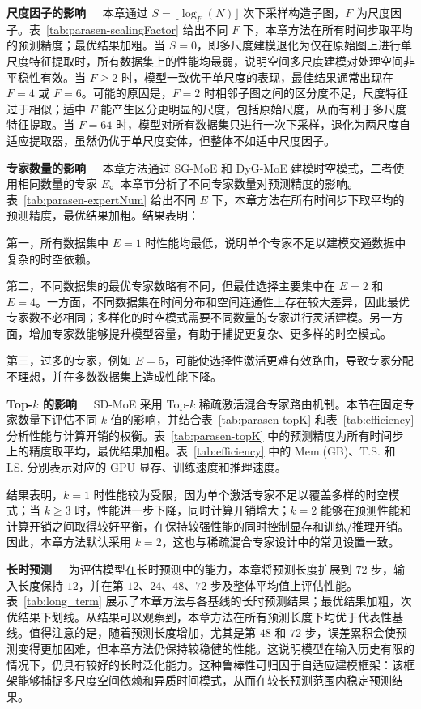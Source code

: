 \noindent\textbf{尺度因子的影响\ \ } 本章通过 $S=\lfloor \log_F(N)\rfloor$ 次下采样构造子图，$F$ 为尺度因子。表~\ref{tab:parasen-scalingFactor} 给出不同 $F$ 下，本章方法在所有时间步取平均的预测精度；最优结果加粗。当 $S=0$，即多尺度建模退化为仅在原始图上进行单尺度特征提取时，所有数据集上的性能均最弱，说明空间多尺度建模对处理空间非平稳性有效。当 $F\ge 2$ 时，模型一致优于单尺度的表现，最佳结果通常出现在 $F=4$ 或 $F=6$。可能的原因是，$F=2$ 时相邻子图之间的区分度不足，尺度特征过于相似；适中 $F$ 能产生区分更明显的尺度，包括原始尺度，从而有利于多尺度特征提取。当 $F=64$ 时，模型对所有数据集只进行一次下采样，退化为两尺度自适应提取器，虽然仍优于单尺度变体，但整体不如适中尺度因子。

\noindent\textbf{专家数量的影响\ \ } 本章方法通过 SG-MoE 和 DyG-MoE 建模时空模式，二者使用相同数量的专家 $E$。本章节分析了不同专家数量对预测精度的影响。表~\ref{tab:parasen-expertNum} 给出不同 $E$ 下，本章方法在所有时间步下取平均的预测精度，最优结果加粗。结果表明：

第一，所有数据集中 $E=1$ 时性能均最低，说明单个专家不足以建模交通数据中复杂的时空依赖。

第二，不同数据集的最优专家数略有不同，但最佳选择主要集中在 $E=2$ 和 $E=4$。一方面，不同数据集在时间分布和空间连通性上存在较大差异，因此最优专家数不必相同；多样化的时空模式需要不同数量的专家进行灵活建模。另一方面，增加专家数能够提升模型容量，有助于捕捉更复杂、更多样的时空模式。

第三，过多的专家，例如 $E=5$，可能使选择性激活更难有效路由，导致专家分配不理想，并在多数数据集上造成性能下降。

\noindent\textbf{Top-$k$ 的影响\ \ } SD-MoE 采用 Top-$k$ 稀疏激活混合专家路由机制。本节在固定专家数量下评估不同 $k$ 值的影响，并结合表~\ref{tab:parasen-topK} 和表~\ref{tab:efficiency} 分析性能与计算开销的权衡。表~\ref{tab:parasen-topK} 中的预测精度为所有时间步上的精度取平均，最优结果加粗。表~\ref{tab:efficiency} 中的 Mem.(GB)、T.S. 和 I.S. 分别表示对应的 GPU 显存、训练速度和推理速度。

结果表明，$k=1$ 时性能较为受限，因为单个激活专家不足以覆盖多样的时空模式；当 $k\ge 3$ 时，性能进一步下降，同时计算开销增大；$k=2$ 能够在预测性能和计算开销之间取得较好平衡，在保持较强性能的同时控制显存和训练/推理开销。因此，本章方法默认采用 $k=2$，这也与稀疏混合专家设计中的常见设置一致。

\noindent\textbf{长时预测\ \ } 为评估模型在长时预测中的能力，本章将预测长度扩展到 $72$ 步，输入长度保持 $12$，并在第 $12$、$24$、$48$、$72$ 步及整体平均值上评估性能。表~\ref{tab:long_term} 展示了本章方法与各基线的长时预测结果；最优结果加粗，次优结果下划线。从结果可以观察到，本章方法在所有预测长度下均优于代表性基线。值得注意的是，随着预测长度增加，尤其是第 $48$ 和 $72$ 步，误差累积会使预测变得更加困难，但本章方法仍保持较稳健的性能。这说明模型在输入历史有限的情况下，仍具有较好的长时泛化能力。这种鲁棒性可归因于自适应建模框架：该框架能够捕捉多尺度空间依赖和异质时间模式，从而在较长预测范围内稳定预测结果。


